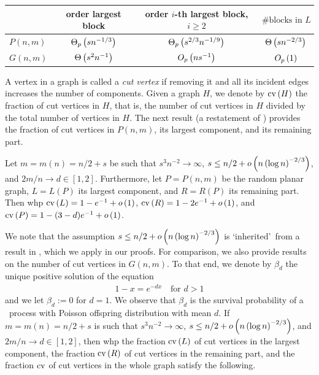 \begin{center}
\def\arraystretch{1.8}\tabcolsep=10pt
\begin{tabular}{l|c|c|c}
    & order largest block & order $i$-th largest block, $i\geq 2$ & $\# \text{blocks in } L$ \\[0.1cm]
    \hline
    $P(n,m)$ & $\Theta_p\left(sn^{-1/3}\right)$ & $\Theta_p\left(s^{2/3}n^{-1/9}\right)$ & $\Theta\left(sn^{-2/3}\right)$ \\[0.1cm]
    \hline
    $G(n,m)$ & $\Theta\left(s^2n^{-1}\right)$ & $O_p\left(ns^{-1}\right)$ & $O_p\left(1\right)$
\end{tabular}
\end{center}

A vertex in a graph is called a {\em cut vertex} if removing it and all its incident edges increases the number of components. Given a graph $H$, we denote by $\operatorname{cv}\left(H\right)$ the fraction of cut vertices in $H$, that is, the number of cut vertices in $H$ divided by the total number of vertices in $H$. The next result (a restatement of ) provides the fraction of cut vertices in $P(n,m)$, its largest component, and its remaining part. 
\begin{thm}\label{thm:main_cut_vertices}
Let $m=m(n)=n/2+s$ be such that $s^3n^{-2}\to \infty$, $s\leq n/2+o\left(n\left(\log n\right)^{-2/3}\right)$, and $2m/n\to d\in [1,2]$. Furthermore, let $P=P(n,m)$ be the random planar graph, $L=L(P)$ its largest component, and $R=R(P)$ its remaining part. Then whp $\operatorname{cv}\left(L\right)=1-e^{-1}+o\left(1\right)$, $\operatorname{cv}\left(R\right)=1-2e^{-1}+o\left(1\right)$, and $\operatorname{cv}\left(P\right)=1-(3-d)e^{-1}+o\left(1\right)$.
\end{thm}

We note that the assumption $s\leq n/2+o\left(n\left(\log n\right)^{-2/3}\right)$ is \lq inherited\rq\ from a result in \cite{KangMosshammerSpruessel2020}, which we apply in our proofs. For comparison, we also provide results on the number of cut vertices in $G(n,m)$. To that end, we denote by $\beta_d$ the unique positive solution of the equation 
\begin{align}\label{eq:7}
1-x=e^{-dx} \quad \text{for } d>1
\end{align}
and we let $\beta_d:=0$ for $d=1$. We observe that $\beta_d$ is the survival probability of a \GW\ process with Poisson offspring distribution with mean $d$. If $m=m(n)=n/2+s$ is such that $s^3n^{-2}\to \infty$, $s\leq n/2+o\left(n\left(\log n\right)^{-2/3}\right)$, and $2m/n\to d\in [1,2]$, then whp the fraction $\operatorname{cv}\left(L\right)$ of cut vertices in the largest component, the fraction $\operatorname{cv}\left(R\right)$ of cut vertices in the remaining part, and the fraction $\operatorname{cv}$ of cut vertices in the whole graph satisfy the following.

